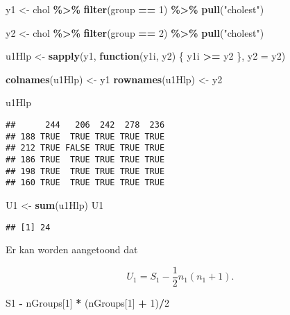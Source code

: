 \documentclass[
  12pt,dutch,coursenotes]{book}
\newenvironment{Shaded}{\begin{snugshade}}{\end{snugshade}}
\newcommand{\ControlFlowTok}[1]{\textcolor[rgb]{0.13,0.29,0.53}{\textbf{#1}}}
\newcommand{\DataTypeTok}[1]{\textcolor[rgb]{0.13,0.29,0.53}{#1}}
\newcommand{\DecValTok}[1]{\textcolor[rgb]{0.00,0.00,0.81}{#1}}
\newcommand{\KeywordTok}[1]{\textcolor[rgb]{0.13,0.29,0.53}{\textbf{#1}}}
\newcommand{\NormalTok}[1]{#1}
\newcommand{\OperatorTok}[1]{\textcolor[rgb]{0.81,0.36,0.00}{\textbf{#1}}}
\newcommand{\StringTok}[1]{\textcolor[rgb]{0.31,0.60,0.02}{#1}}
\theoremstyle{definition}
\theoremstyle{definition}
\theoremstyle{definition}
\theoremstyle{remark}
\begin{document}
\begin{Shaded}
\begin{Highlighting}[]
\NormalTok{y1 \textless{}{-}}\StringTok{ }\NormalTok{chol }\OperatorTok{\%\textgreater{}\%}\StringTok{ }\KeywordTok{filter}\NormalTok{(group }\OperatorTok{==}\StringTok{ }\DecValTok{1}\NormalTok{) }\OperatorTok{\%\textgreater{}\%}\StringTok{ }\KeywordTok{pull}\NormalTok{(}\StringTok{"cholest"}\NormalTok{)}

\NormalTok{y2 \textless{}{-}}\StringTok{ }\NormalTok{chol }\OperatorTok{\%\textgreater{}\%}\StringTok{ }\KeywordTok{filter}\NormalTok{(group }\OperatorTok{==}\StringTok{ }\DecValTok{2}\NormalTok{) }\OperatorTok{\%\textgreater{}\%}\StringTok{ }\KeywordTok{pull}\NormalTok{(}\StringTok{"cholest"}\NormalTok{)}

\NormalTok{u1Hlp \textless{}{-}}\StringTok{ }\KeywordTok{sapply}\NormalTok{(y1, }\ControlFlowTok{function}\NormalTok{(y1i, y2) \{}
\NormalTok{    y1i }\OperatorTok{\textgreater{}=}\StringTok{ }\NormalTok{y2}
\NormalTok{\}, }\DataTypeTok{y2 =}\NormalTok{ y2)}

\KeywordTok{colnames}\NormalTok{(u1Hlp) \textless{}{-}}\StringTok{ }\NormalTok{y1}
\KeywordTok{rownames}\NormalTok{(u1Hlp) \textless{}{-}}\StringTok{ }\NormalTok{y2}

\NormalTok{u1Hlp}
\end{Highlighting}
\end{Shaded}

\begin{verbatim}
##      244   206  242  278  236
## 188 TRUE  TRUE TRUE TRUE TRUE
## 212 TRUE FALSE TRUE TRUE TRUE
## 186 TRUE  TRUE TRUE TRUE TRUE
## 198 TRUE  TRUE TRUE TRUE TRUE
## 160 TRUE  TRUE TRUE TRUE TRUE
\end{verbatim}

\begin{Shaded}
\begin{Highlighting}[]
\NormalTok{U1 \textless{}{-}}\StringTok{ }\KeywordTok{sum}\NormalTok{(u1Hlp)}
\NormalTok{U1}
\end{Highlighting}
\end{Shaded}

\begin{verbatim}
## [1] 24
\end{verbatim}

Er kan worden aangetoond dat

\[U_1 = S_1 - \frac{1}{2}n_1(n_1+1).\]

\begin{Shaded}
\begin{Highlighting}[]
\NormalTok{S1 }\OperatorTok{{-}}\StringTok{ }\NormalTok{nGroups[}\DecValTok{1}\NormalTok{] }\OperatorTok{*}\StringTok{ }\NormalTok{(nGroups[}\DecValTok{1}\NormalTok{] }\OperatorTok{+}\StringTok{ }\DecValTok{1}\NormalTok{)}\OperatorTok{/}\DecValTok{2}
\end{Highlighting}
\end{Shaded}
\end{document}
